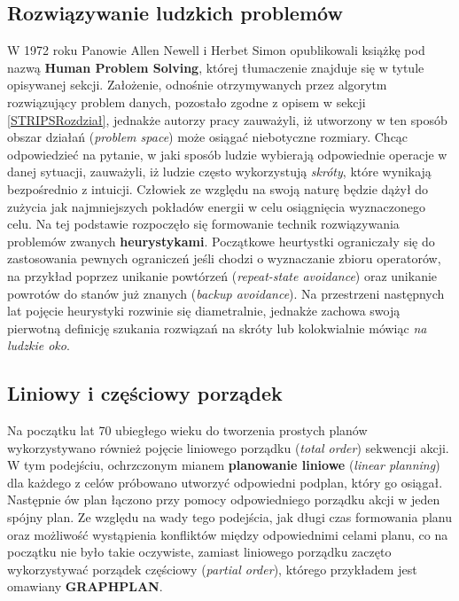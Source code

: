     \subsection{Rozwiązywanie ludzkich problemów}
    W 1972 roku Panowie Allen Newell i Herbet Simon opublikowali książkę pod nazwą \textbf{Human Problem Solving}, której tłumaczenie
    znajduje się w tytule opisywanej sekcji. Założenie, odnośnie otrzymywanych przez algorytm rozwiązujący problem danych, 
    pozostało zgodne z opisem w sekcji \ref{STRIPSRozdział}, jednakże autorzy pracy zauważyli, iż utworzony w ten sposób 
    obszar działań (\textit{problem space}) może osiągać niebotyczne rozmiary. Chcąc odpowiedzieć na pytanie, 
    w jaki sposób ludzie wybierają odpowiednie operacje w danej sytuacji, zauważyli, iż ludzie często wykorzystują \textit{skróty},
    które wynikają bezpośrednio z intuicji. Człowiek ze względu na swoją naturę będzie dążył do zużycia jak najmniejszych 
    pokładów energii w celu osiągnięcia wyznaczonego celu. Na tej podstawie rozpoczęło się formowanie 
    technik rozwiązywania problemów zwanych \textbf{heurystykami}. Początkowe heurtystki ograniczały się do zastosowania 
    pewnych ograniczeń jeśli chodzi o wyznaczanie zbioru operatorów, na przykład poprzez unikanie powtórzeń (\textit{repeat-state avoidance})
    oraz unikanie powrotów do stanów już znanych (\textit{backup avoidance}). Na przestrzeni następnych lat pojęcie heurystyki rozwinie się diametralnie, jednakże
    zachowa swoją pierwotną definicję szukania rozwiązań na skróty lub kolokwialnie mówiąc \textit{na ludzkie oko}.  

    \subsection{Liniowy i częściowy porządek}
    Na początku lat 70 ubiegłego wieku do tworzenia prostych planów wykorzystywano również pojęcie 
    liniowego porządku (\textit{total order}) sekwencji akcji. W tym podejściu, ochrzczonym mianem \textbf{planowanie liniowe}
    (\textit{linear planning}) dla każdego z celów  próbowano utworzyć odpowiedni podplan, który go osiągał.
    Następnie ów plan łączono przy pomocy odpowiedniego porządku akcji w jeden spójny plan.
    Ze względu na wady tego podejścia, jak długi czas formowania planu oraz możliwość wystąpienia konfliktów między 
    odpowiednimi celami planu, co na początku nie było takie oczywiste, zamiast liniowego porządku zaczęto wykorzystywać porządek częściowy (\textit{partial order}),
    którego przykładem jest omawiany \textbf{GRAPHPLAN}.

